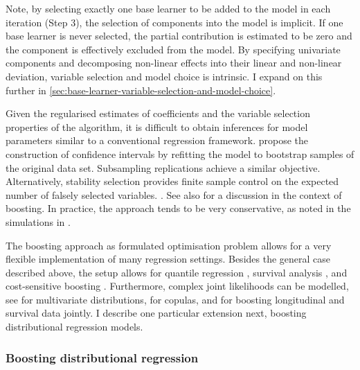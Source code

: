 Note, by selecting exactly one base learner to be added to the model in each iteration (Step 3), the selection of components into the model is implicit. If one base learner is never selected, the partial contribution is estimated to be zero and the component is effectively excluded from the model. By specifying univariate components and decomposing non-linear effects into their linear and non-linear deviation, variable selection and model choice is intrinsic. I expand on this further in \autoref{sec:base-learner-variable-selection-and-model-choice}.

Given the regularised estimates of coefficients and the variable selection properties of the algorithm, it is difficult to obtain inferences for model parameters similar to a conventional regression framework. \textcite{hofnerUnifiedFrameworkConstrained2016} propose the construction of confidence intervals by refitting the model to bootstrap samples of the original data set. Subsampling replications achieve a similar objective. Alternatively, stability selection provides finite sample control on the expected number of falsely selected variables. \autocite{meinshausenStabilitySelectionStability2010, shahVariableSelectionError2013}. See also \textcite{hofnerControllingFalseDiscoveries2015} for a discussion in the context of boosting. In practice, the approach tends to be very conservative, as noted in the simulations in \textcite{hofnerControllingFalseDiscoveries2015, thomasProbingSparseFast2017}.

The boosting approach as formulated optimisation problem allows for a very flexible implementation of many regression settings. Besides the general case described above, the setup allows for quantile regression \autocite{fenskeIdentifyingRiskFactors2011}, survival analysis \autocite{buhlmannBoostingAlgorithmsRegularization2007}, and cost-sensitive boosting \autocite{krieglerSmallAreaEstimation2010}. Furthermore, complex joint likelihoods can be modelled, see \textcite{stromerBoostingMultivariateStructured2022} for multivariate distributions, \textcite{hansBoostingDistributionalCopula2022} for copulas, and \textcite{griesbachJointModellingApproaches2021} for boosting longitudinal and survival data jointly. I describe one particular extension next, boosting distributional regression models.


\subsubsection*{Boosting distributional regression}

